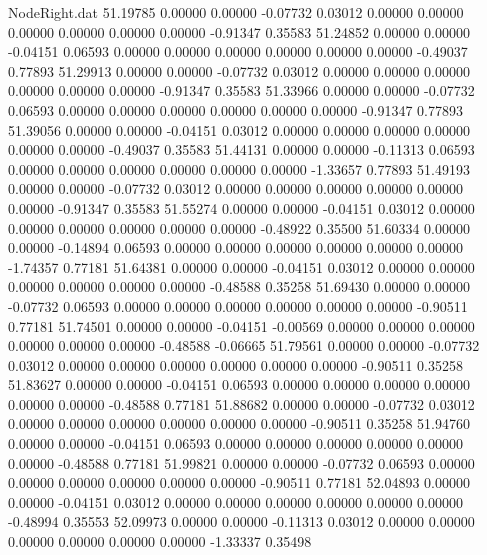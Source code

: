\begin{filecontents}{NodeRight.dat}
  51.19785    0.00000    0.00000    -0.07732    0.03012    0.00000    0.00000    0.00000    0.00000    0.00000    0.00000   -0.91347    0.35583
  51.24852    0.00000    0.00000    -0.04151    0.06593    0.00000    0.00000    0.00000    0.00000    0.00000    0.00000   -0.49037    0.77893
  51.29913    0.00000    0.00000    -0.07732    0.03012    0.00000    0.00000    0.00000    0.00000    0.00000    0.00000   -0.91347    0.35583
  51.33966    0.00000    0.00000    -0.07732    0.06593    0.00000    0.00000    0.00000    0.00000    0.00000    0.00000   -0.91347    0.77893
  51.39056    0.00000    0.00000    -0.04151    0.03012    0.00000    0.00000    0.00000    0.00000    0.00000    0.00000   -0.49037    0.35583
  51.44131    0.00000    0.00000    -0.11313    0.06593    0.00000    0.00000    0.00000    0.00000    0.00000    0.00000   -1.33657    0.77893
  51.49193    0.00000    0.00000    -0.07732    0.03012    0.00000    0.00000    0.00000    0.00000    0.00000    0.00000   -0.91347    0.35583
  51.55274    0.00000    0.00000    -0.04151    0.03012    0.00000    0.00000    0.00000    0.00000    0.00000    0.00000   -0.48922    0.35500
  51.60334    0.00000    0.00000    -0.14894    0.06593    0.00000    0.00000    0.00000    0.00000    0.00000    0.00000   -1.74357    0.77181
  51.64381    0.00000    0.00000    -0.04151    0.03012    0.00000    0.00000    0.00000    0.00000    0.00000    0.00000   -0.48588    0.35258
  51.69430    0.00000    0.00000    -0.07732    0.06593    0.00000    0.00000    0.00000    0.00000    0.00000    0.00000   -0.90511    0.77181
  51.74501    0.00000    0.00000    -0.04151   -0.00569    0.00000    0.00000    0.00000    0.00000    0.00000    0.00000   -0.48588   -0.06665
  51.79561    0.00000    0.00000    -0.07732    0.03012    0.00000    0.00000    0.00000    0.00000    0.00000    0.00000   -0.90511    0.35258
  51.83627    0.00000    0.00000    -0.04151    0.06593    0.00000    0.00000    0.00000    0.00000    0.00000    0.00000   -0.48588    0.77181
  51.88682    0.00000    0.00000    -0.07732    0.03012    0.00000    0.00000    0.00000    0.00000    0.00000    0.00000   -0.90511    0.35258
  51.94760    0.00000    0.00000    -0.04151    0.06593    0.00000    0.00000    0.00000    0.00000    0.00000    0.00000   -0.48588    0.77181
  51.99821    0.00000    0.00000    -0.07732    0.06593    0.00000    0.00000    0.00000    0.00000    0.00000    0.00000   -0.90511    0.77181
  52.04893    0.00000    0.00000    -0.04151    0.03012    0.00000    0.00000    0.00000    0.00000    0.00000    0.00000   -0.48994    0.35553
  52.09973    0.00000    0.00000    -0.11313    0.03012    0.00000    0.00000    0.00000    0.00000    0.00000    0.00000   -1.33337    0.35498

\end{filecontents}
